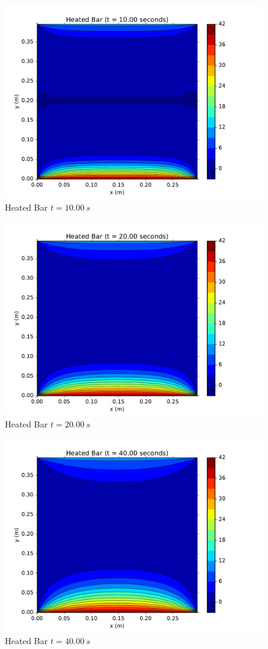 \documentclass[addpoints]{exam}
\begin{document}
\begin{questions}
\begin{solution}
\begin{figure}[H]
\centering
\includegraphics[width=.8\linewidth]{figs/10-00_sec_heat-eq_colorplot.pdf}
\caption{Heated Bar $t=10.00\ s$}
\label{fig:10.0}
\end{figure}

\begin{figure}[H]
\centering
\includegraphics[width=.8\linewidth]{figs/20-00_sec_heat-eq_colorplot.pdf}
\caption{Heated Bar $t=20.00\ s$}
\label{fig:20.0}
\end{figure}

\begin{figure}[H]
\centering
\includegraphics[width=.8\linewidth]{figs/40-00_sec_heat-eq_colorplot.pdf}
\caption{Heated Bar $t=40.00\ s$}
\label{fig:40.0}
\end{figure}


\end{solution}
\end{questions}
\end{document}

